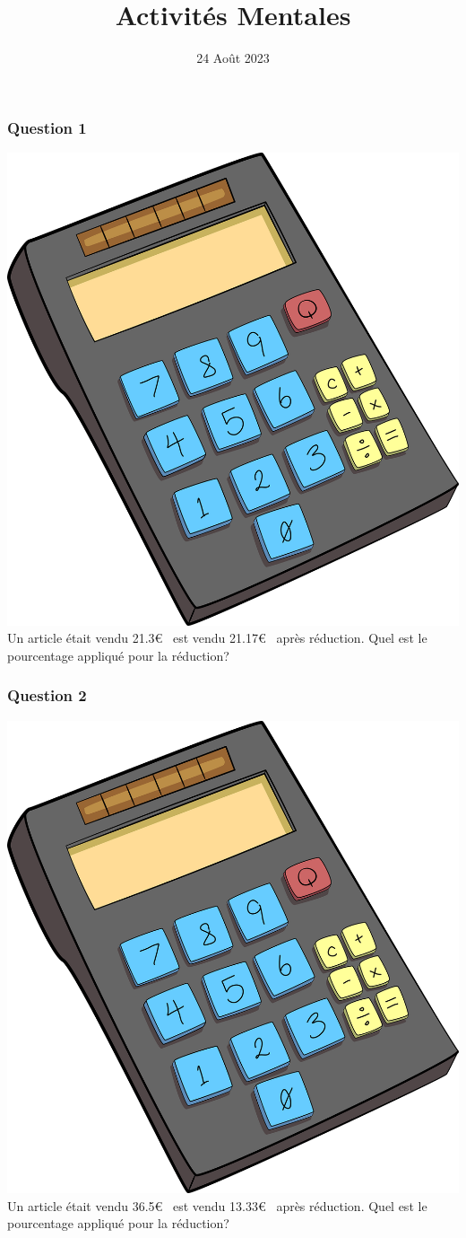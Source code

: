 \documentclass[15pt, mathserif]{beamer}
\title{Activités Mentales}
\date{24 Août 2023}
\begin{document}
\begin{frame}
    \titlepage
\end{frame}

\begin{frame} 
	\frametitle{Question 1}
\includegraphics[scale=0.01]{calculatrice}Un article était vendu 21.3\euro ~ est vendu 21.17\euro ~ après réduction. Quel est le pourcentage appliqué pour la réduction? \end{frame}


\begin{frame} 
	\frametitle{Question 2}
\includegraphics[scale=0.01]{calculatrice}Un article était vendu 36.5\euro ~ est vendu 13.33\euro ~ après réduction. Quel est le pourcentage appliqué pour la réduction? \end{frame}
\end{document}
